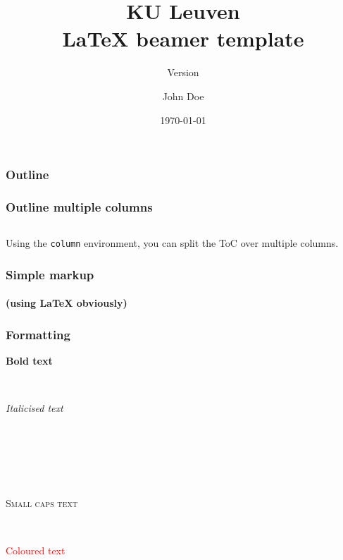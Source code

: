 \documentclass[t, xcolor=table, aspectratio=169]{beamer}
\title{KU Leuven\\\indent \LaTeX{} beamer template}
\subtitle{Version \KULversion}
\institute{Campus Geel, Faculty of industrial engineering sciences}
\author{John Doe}
\date{\today}
\begin{document}
    \begin{frame}
        \titlepage
    \end{frame}

    \begin{frame}
        \frametitle{Outline}
        \vspace{-1em}
        \tableofcontentsTOP %
    \end{frame}

    \begin{frame}
        \frametitle{Outline multiple columns}
        \vspace{1em}
        \begin{columns}[onlytextwidth,T]
            \begin{column}{0.5\textwidth}
                \tableofcontentsTOP[sections={1}]
            \end{column}
            \begin{column}{0.5\textwidth}
                \tableofcontentsTOP[sections={2-3}]
            \end{column}
        \end{columns}
        \vspace{1em}
        Using the \texttt{column} environment, you can split the ToC over multiple columns.
    \end{frame}

    \begin{frame}
        \frametitle{Simple markup}
        \framesubtitle{(using \LaTeX{} obviously)}
    \end{frame}

    \begin{frame}
        \frametitle{Formatting}
        \textbf{Bold text}
        \par\ \par
        \textit{Italicised text}
        \par\ \par
        \par\ \par
        \par\ \par
        \textsc{Small caps text}
        \par\ \par
        \textcolor{red}{Coloured text}
    \end{frame}
\end{document}
